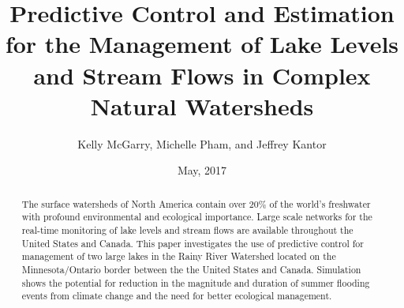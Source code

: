 \documentclass{elsarticle}
\title{Predictive Control and Estimation for the Management of Lake Levels and Stream Flows in Complex Natural Watersheds}
\author{Kelly McGarry, Michelle Pham, and Jeffrey Kantor}
\date{May, 2017}
\begin{document}
\begin{abstract}
The surface watersheds of North America contain over 20\% of the world's freshwater with profound environmental and ecological importance. Large scale networks for the real-time monitoring of lake levels and stream flows are available throughout the United States and Canada. This paper investigates the use of predictive control for management of two large lakes in the Rainy River Watershed located on the Minnesota/Ontario border between the the United States and Canada. Simulation shows the potential for reduction in the magnitude and duration of summer flooding events from climate change and the need for better ecological management.
\end{abstract}

\maketitle
\end{document}
